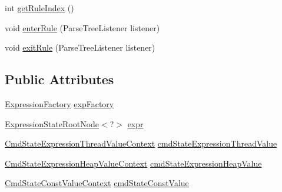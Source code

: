 \begin{DoxyCompactItemize}
\item 
int \hyperlink{classgov_1_1nasa_1_1jpf_1_1inspector_1_1server_1_1expression_1_1parser_1_1_expression_grammar_paacaa2424bb30d5b61478a2ac87dd697e_a608fa686fe5a044f72108eadfd78ab98}{get\+Rule\+Index} ()
\item 
void \hyperlink{classgov_1_1nasa_1_1jpf_1_1inspector_1_1server_1_1expression_1_1parser_1_1_expression_grammar_paacaa2424bb30d5b61478a2ac87dd697e_acd4f9d3f277b10ea818f5958fc21136b}{enter\+Rule} (Parse\+Tree\+Listener listener)
\item 
void \hyperlink{classgov_1_1nasa_1_1jpf_1_1inspector_1_1server_1_1expression_1_1parser_1_1_expression_grammar_paacaa2424bb30d5b61478a2ac87dd697e_a4a0647027645ab7123fda9ca329937d0}{exit\+Rule} (Parse\+Tree\+Listener listener)
\end{DoxyCompactItemize}
\subsection*{Public Attributes}
\begin{DoxyCompactItemize}
\item 
\hyperlink{classgov_1_1nasa_1_1jpf_1_1inspector_1_1server_1_1expression_1_1_expression_factory}{Expression\+Factory} \hyperlink{classgov_1_1nasa_1_1jpf_1_1inspector_1_1server_1_1expression_1_1parser_1_1_expression_grammar_paacaa2424bb30d5b61478a2ac87dd697e_ab9f1bd3931200e3be4ec0c7b9365e015}{exp\+Factory}
\item 
\hyperlink{interfacegov_1_1nasa_1_1jpf_1_1inspector_1_1server_1_1expression_1_1_expression_state_root_node}{Expression\+State\+Root\+Node}$<$?$>$ \hyperlink{classgov_1_1nasa_1_1jpf_1_1inspector_1_1server_1_1expression_1_1parser_1_1_expression_grammar_paacaa2424bb30d5b61478a2ac87dd697e_a41e227629b06c5b20a032613cd62b5ba}{expr}
\item 
\hyperlink{classgov_1_1nasa_1_1jpf_1_1inspector_1_1server_1_1expression_1_1parser_1_1_expression_grammar_pa5a19a4a13564890289bc65b6a0372f78}{Cmd\+State\+Expression\+Thread\+Value\+Context} \hyperlink{classgov_1_1nasa_1_1jpf_1_1inspector_1_1server_1_1expression_1_1parser_1_1_expression_grammar_paacaa2424bb30d5b61478a2ac87dd697e_a52adba58fe9858bd2c9c6d4fedb80a8b}{cmd\+State\+Expression\+Thread\+Value}
\item 
\hyperlink{classgov_1_1nasa_1_1jpf_1_1inspector_1_1server_1_1expression_1_1parser_1_1_expression_grammar_pa975e8909fcf76b653e93728b8bf729a1}{Cmd\+State\+Expression\+Heap\+Value\+Context} \hyperlink{classgov_1_1nasa_1_1jpf_1_1inspector_1_1server_1_1expression_1_1parser_1_1_expression_grammar_paacaa2424bb30d5b61478a2ac87dd697e_a99adcde9234e91d628b29611c48a6205}{cmd\+State\+Expression\+Heap\+Value}
\item 
\hyperlink{classgov_1_1nasa_1_1jpf_1_1inspector_1_1server_1_1expression_1_1parser_1_1_expression_grammar_pa618023edddc6cf63ca4452111d0560c6}{Cmd\+State\+Const\+Value\+Context} \hyperlink{classgov_1_1nasa_1_1jpf_1_1inspector_1_1server_1_1expression_1_1parser_1_1_expression_grammar_paacaa2424bb30d5b61478a2ac87dd697e_a65458fe339a6fddf1d6da5a5c44883db}{cmd\+State\+Const\+Value}
\end{DoxyCompactItemize}


